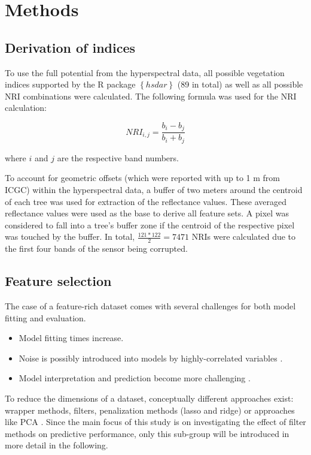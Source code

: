 \documentclass[letterpaper, peerreview, draftcls]{IEEEtran}
\begin{document}
\section{Methods}

\subsection{Derivation of indices}
\noindent To use the full potential from the hyperspectral data, all possible vegetation indices supported by the R package $\left\{hsdar\right\}$ (89 in total) as well as all possible \ac{NRI} combinations were calculated.
The following formula was used for the NRI calculation:

\begin{equation}
	NRI_{i,j} = \frac{b_{i} - b_{j}}{b_{i} + b_{j}}
\end{equation}

\noindent
where \(i\) and \(j\) are the respective band numbers.

\bigbreak{}

\noindent To account for geometric offsets (which were reported with up to 1 m from \ac{ICGC}) within the hyperspectral data, a buffer of two meters around the centroid of each tree was used for extraction of the reflectance values.
These averaged reflectance values were used as the base to derive all feature sets.
A pixel was considered to fall into a tree's buffer zone if the centroid of the respective pixel was touched by the buffer.
In total, \(\frac{121*122}{2} = 7471\) NRIs were calculated due to the first four bands of the sensor being corrupted.

\subsection{Feature selection}

The case of a feature-rich dataset comes with several challenges for both model fitting and evaluation.

\begin{itemize}
	\item Model fitting times increase.
	\item Noise is possibly introduced into models by highly-correlated variables \cite{johnstoneiainm.2009}.
	\item Model interpretation and prediction become more challenging \cite{johnstoneiainm.2009}.
\end{itemize}

To reduce the dimensions of a dataset, conceptually different approaches exist: wrapper methods, filters, penalization methods (lasso and ridge) or approaches like \ac{PCA} \cite{das2001, jolliffe2016}.
Since the main focus of this study is on investigating the effect of filter methods on predictive performance, only this sub-group will be introduced in more detail in the following.
\end{document}
